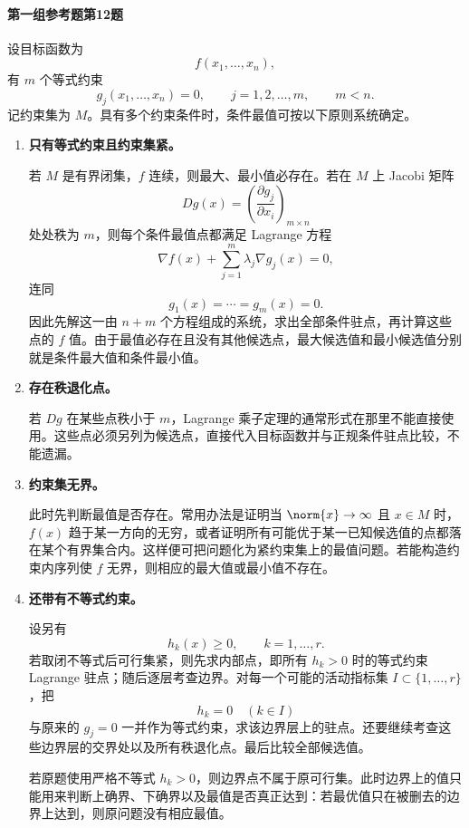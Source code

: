 \paragraph{第一组参考题第12题}
\begin{xsolution}
设目标函数为
\[
  f(x_1,\ldots,x_n),
\]
有 $m$ 个等式约束
\[
  g_j(x_1,\ldots,x_n)=0,
  \qquad j=1,2,\ldots,m,
  \qquad m<n.
\]
记约束集为 $M$。具有多个约束条件时，条件最值可按以下原则系统确定。

\begin{enumerate}[label=\arabic*.]
  \item \textbf{只有等式约束且约束集紧。}

  若 $M$ 是有界闭集，$f$ 连续，则最大、最小值必存在。若在 $M$ 上 Jacobi 矩阵
  \[
    Dg(x)=\left(\frac{\partial g_j}{\partial x_i}\right)_{m\times n}
  \]
  处处秩为 $m$，则每个条件最值点都满足 Lagrange 方程
  \[
    \nabla f(x)+\sum_{j=1}^m\lambda_j\nabla g_j(x)=0,
  \]
  连同
  \[
    g_1(x)=\cdots=g_m(x)=0.
  \]
  因此先解这一由 $n+m$ 个方程组成的系统，求出全部条件驻点，再计算这些点的 $f$ 值。由于最值必存在且没有其他候选点，最大候选值和最小候选值分别就是条件最大值和条件最小值。

  \item \textbf{存在秩退化点。}

  若 $Dg$ 在某些点秩小于 $m$，Lagrange 乘子定理的通常形式在那里不能直接使用。这些点必须另列为候选点，直接代入目标函数并与正规条件驻点比较，不能遗漏。

  \item \textbf{约束集无界。}

  此时先判断最值是否存在。常用办法是证明当 $\norm{x}\to\infty$ 且 $x\in M$ 时，$f(x)$ 趋于某一方向的无穷，或者证明所有可能优于某一已知候选值的点都落在某个有界集合内。这样便可把问题化为紧约束集上的最值问题。若能构造约束内序列使 $f$ 无界，则相应的最大值或最小值不存在。

  \item \textbf{还带有不等式约束。}

  设另有
  \[
    h_k(x)\ge0,
    \qquad k=1,\ldots,r.
  \]
  若取闭不等式后可行集紧，则先求内部点，即所有 $h_k>0$ 时的等式约束 Lagrange 驻点；随后逐层考查边界。对每一个可能的活动指标集 $I\subset\{1,\ldots,r\}$，把
  \[
    h_k=0\quad(k\in I)
  \]
  与原来的 $g_j=0$ 一并作为等式约束，求该边界层上的驻点。还要继续考查这些边界层的交界处以及所有秩退化点。最后比较全部候选值。

  若原题使用严格不等式 $h_k>0$，则边界点不属于原可行集。此时边界上的值只能用来判断上确界、下确界以及最值是否真正达到：若最优值只在被删去的边界上达到，则原问题没有相应最值。


\end{enumerate}
\end{xsolution}
